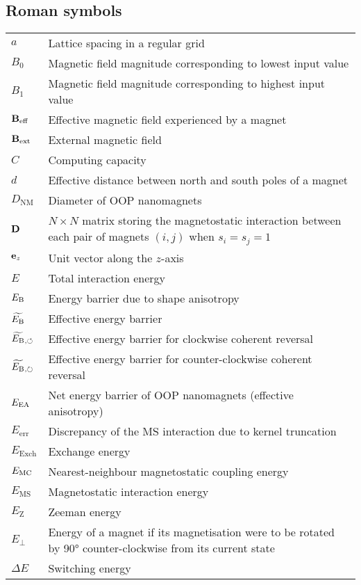 \subsection*{Roman symbols}
\begin{longtable}[l]{p{50pt} p{295pt}}
	$a$ & Lattice spacing in a regular grid\vspace{\whiteline}\\

	$B_0$ & Magnetic field magnitude corresponding to lowest input value \\
	$B_1$ & Magnetic field magnitude corresponding to highest input value \\
	$\boldsymbol{\mathbf{B}}_\mathrm{eff}$ & Effective magnetic field experienced by a magnet \\
	$\boldsymbol{\mathbf{B}}_\mathrm{ext}$ & External magnetic field\vspace{\whiteline}\\
	
	$C$ & Computing capacity\vspace{\whiteline}\\

	$d$ & Effective distance between north and south poles of a magnet \\
	$D_\mathrm{NM}$ & Diameter of OOP nanomagnets \\
	$\boldsymbol{\mathbf{D}}$ & $N \times N$ matrix storing the magnetostatic interaction between each pair of magnets $(i,j)$ when $s_i=s_j=1$\vspace{\whiteline}\\

	$\boldsymbol{\mathbf{e}}_z$ & Unit vector along the $z$-axis \\
	$E$ & Total interaction energy \\
	$E_\mathrm{B}$ & Energy barrier due to shape anisotropy \\
	$\widetilde{E_\mathrm{B}}$ & Effective energy barrier \\
	$\widetilde{E_\mathrm{B}}{}_{,\circlearrowleft}$ & Effective energy barrier for clockwise coherent reversal \\
	$\widetilde{E_\mathrm{B}}{}_{,\circlearrowright}$ & Effective energy barrier for counter-clockwise coherent reversal \\
	$E_\mathrm{EA}$ & Net energy barrier of OOP nanomagnets (effective anisotropy) \\
	$E_\mathrm{err}$ & Discrepancy of the MS interaction due to kernel truncation \\
	$E_\mathrm{Exch}$ & Exchange energy\\
	$E_\mathrm{MC}$ & Nearest-neighbour magnetostatic coupling energy \\
	$E_\mathrm{MS}$ & Magnetostatic interaction energy \\
	$E_\mathrm{Z}$ & Zeeman energy\\
	$E_\perp$ & Energy of a magnet if its magnetisation were to be rotated by \ang{90} counter-clockwise from its current state \\
	$\Delta E$ & Switching energy\vspace{\whiteline}\\
	

\end{longtable}
